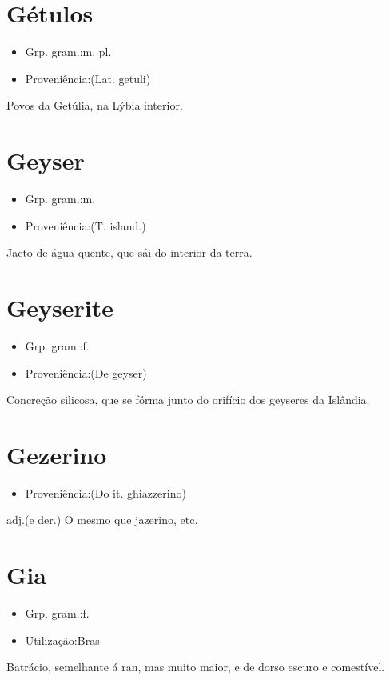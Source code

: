 \section{Gétulos}
\begin{itemize}
\item {Grp. gram.:m. pl.}
\end{itemize}
\begin{itemize}
\item {Proveniência:(Lat. \textunderscore getuli\textunderscore )}
\end{itemize}
Povos da Getúlia, na Lýbia interior.
\section{Geyser}
\begin{itemize}
\item {Grp. gram.:m.}
\end{itemize}
\begin{itemize}
\item {Proveniência:(T. island.)}
\end{itemize}
Jacto de água quente, que sái do interior da terra.
\section{Geyserite}
\begin{itemize}
\item {Grp. gram.:f.}
\end{itemize}
\begin{itemize}
\item {Proveniência:(De \textunderscore geyser\textunderscore )}
\end{itemize}
Concreção silicosa, que se fórma junto do orifício dos geyseres da Islândia.
\section{Gezerino}
\begin{itemize}
\item {Proveniência:(Do it. \textunderscore ghiazzerino\textunderscore )}
\end{itemize}
\textunderscore adj.\textunderscore  (e der.)
O mesmo que \textunderscore jazerino\textunderscore , etc.
\section{Gia}
\begin{itemize}
\item {Grp. gram.:f.}
\end{itemize}
\begin{itemize}
\item {Utilização:Bras}
\end{itemize}
Batrácio, semelhante á ran, mas muito maior, e de dorso escuro e comestível.
